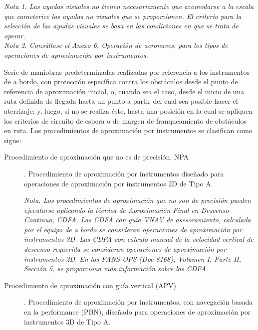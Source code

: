 \begin{tcolorbox}[title= {Pista de vuelo por instrumentos o Pista para aproximaciones de precisión.
    OACI. Anexo 14. Edición 2018}]
{\begin{enumerate}[a)]
\end{enumerate}

\emph{Nota 1. Las ayudas visuales no tienen necesariamente que acomodarse a la escala que caracterice las ayudas no visuales que se proporcionen. El criterio para la selección de las ayudas visuales se basa en las condiciones en que se trata de operar. \\
Nota 2. Consúltese el Anexo 6,  Operación de aeronaves, para los tipos de operaciones de aproximación por
instrumentos.
}

  }
\end{tcolorbox}


\begin{tcolorbox}[title={Procedimiento de aproximación por instrumentos (IAP). OACI Anexo 6. Edición 2018}]
  {\footnotesize

    Serie de maniobras predeterminadas realizadas por referencia a los instrumentos de a bordo, con protección específica contra los obstáculos desde el punto de referencia de aproximación inicial, o, cuando sea el caso, desde el inicio de una ruta definida de llegada hasta un punto a partir del cual sea posible hacer el aterrizaje; y, luego, si no se realiza éste, hasta una posición en la cual se apliquen los criterios de circuito de espera o de margen de franqueamiento de obstáculos en ruta. Los procedimientos de aproximación por instrumentos se clasifican como sigue:
    
    \begin{description}
    \item [Procedimiento de aproximación que no es de precisión, \ac{NPA}]. Procedimiento de aproximación por instrumentos diseñado para operaciones de aproximación por instrumentos 2D de Tipo A.

\emph{Nota. Los procedimientos de aproximación que no son de precisión pueden ejecutarse aplicando la técnica de
Aproximación Final en Descenso Continuo, \ac{CDFA}. Las \ac{CDFA} con guía \ac{VNAV} de asesoramiento, calculada por el equipo de
a bordo se consideran operaciones de aproximación por instrumentos 3D. Las \ac{CDFA} con cálculo manual de la velocidad
vertical de descenso requerida se consideran operaciones de aproximación por instrumentos 2D. En los PANS-OPS
(Doc 8168), Volumen I, Parte II, Sección 5, se proporciona más información sobre las CDFA.
}

\item [Procedimiento de aproximación con guía vertical (APV)]. Procedimiento de aproximación por instrumentos, con
navegación basada en la performance (PBN), diseñado para operaciones de aproximación por instrumentos 3D de
Tipo A.


\end{description}}
\end{tcolorbox}
